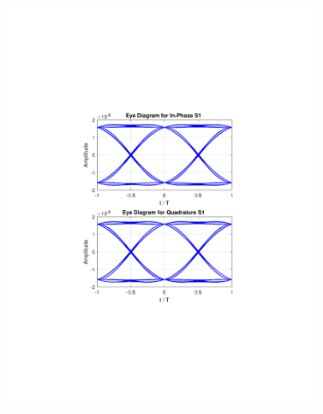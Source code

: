 \begin{figure}[H]
	\centering
	\begin{subfigure}{.5\textwidth}
		\centering
		\includegraphics[clip, trim=5cm 7cm 5cm 7cm, width=\textwidth]{./sdf/m_qam_system/figures/eye120db09ro.pdf}
	\end{subfigure}%
	\begin{subfigure}{.5\textwidth}
		\centering

\end{subfigure}
\end{figure}
